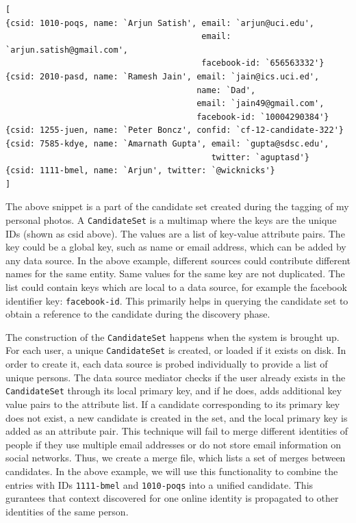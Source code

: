\begin{verbatim}
[
{csid: 1010-poqs, name: `Arjun Satish', email: `arjun@uci.edu', 
                                        email: `arjun.satish@gmail.com',
                                        facebook-id: `656563332'}
{csid: 2010-pasd, name: `Ramesh Jain', email: `jain@ics.uci.ed',
                                       name: `Dad',
                                       email: `jain49@gmail.com',
                                       facebook-id: `10004290384'}
{csid: 1255-juen, name: `Peter Boncz', confid: `cf-12-candidate-322'}
{csid: 7585-kdye, name: `Amarnath Gupta', email: `gupta@sdsc.edu',
                                          twitter: `aguptasd'}
{csid: 1111-bmel, name: `Arjun', twitter: `@wicknicks'}
]
\end{verbatim}

The above snippet is a part of the candidate set created during the tagging of my personal photos. A \texttt{CandidateSet} is a multimap where the keys are the unique IDs (shown as csid above). The values are a list of key-value attribute pairs. The key could be a global key, such as name or email address, which can be added by any data source. In the above example, different sources could contribute different names for the same entity. Same values for the same key are not duplicated. The list could contain keys which are local to a data source, for example the facebook identifier key: \texttt{facebook-id}. This primarily helps in querying the candidate set to obtain a reference to the candidate during the discovery phase. 

The construction of the \texttt{CandidateSet} happens when the system is brought up. For each user, a unique \texttt{CandidateSet} is created, or loaded if it exists on disk. In order to create it, each data source is probed individually to provide a list of unique persons. The data source mediator checks if the user already exists in the \texttt{CandidateSet} through its local primary key, and if he does, adds additional key value pairs to the attribute list. If a candidate corresponding to its primary key does not exist, a new candidate is created in the set, and the local primary key is added as an attribute pair. This technique will fail to merge different identities of people if they use multiple email addresses or do not store email information on social networks. Thus, we create a merge file, which lists a set of merges between candidates. In the above example, we will use this functionality to combine the entries with IDs \texttt{1111-bmel} and \texttt{1010-poqs} into a unified candidate. This gurantees that context discovered for one online identity is propagated to other identities of the same person.


